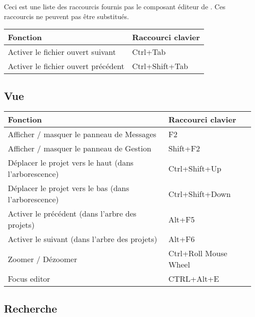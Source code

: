 Ceci est une liste des raccourcis fournis pas le composant éditeur de \codeblocks. Ces raccourcis ne peuvent pas être substitués.

\begin{tabular}{|l|l|}\hline
Fonction 		                    &	Raccourci clavier\\ \hline
Activer le fichier ouvert suivant	&   Ctrl+Tab\\ \hline
Activer le fichier ouvert précédent &   Ctrl+Shift+Tab\\ \hline
\end{tabular}

\subsection{Vue}

\begin{tabular}{|l|l|}\hline
Fonction 		                                        &	Raccourci clavier\\ \hline
Afficher / masquer le panneau de Messages	            &	F2\\ \hline
Afficher / masquer le panneau de Gestion	            &	Shift+F2\\ \hline
Déplacer le projet vers le haut (dans l'arborescence)   &   Ctrl+Shift+Up\\ \hline
Déplacer le projet vers le bas  (dans l'arborescence)   &   Ctrl+Shift+Down\\ \hline
Activer le précédent (dans l'arbre des projets)         & 	Alt+F5\\ \hline
Activer le suivant   (dans l'arbre des projets)         & 	Alt+F6\\ \hline
Zoomer / Dézoomer 	                                    &   Ctrl+Roll Mouse Wheel\\ \hline
Focus editor 	                                        &   CTRL+Alt+E\\ \hline
\end{tabular}

\subsection{Recherche}

